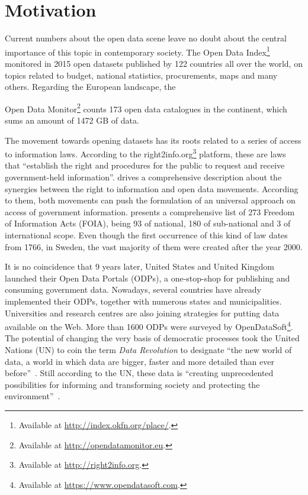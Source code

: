 \section{Motivation}
Current numbers about the open data scene leave no doubt about the central importance of this topic in contemporary society.
The Open Data Index\footnote{Available at \url{http://index.okfn.org/place/}.} monitored in 2015 open datasets published by 122 countries all over the world, on topics related to budget, national statistics, procurements, maps and many others.
Regarding the European landscape, the {Open Data Monitor\footnote{Available at \url{http://opendatamonitor.eu}.} counts 173 open data catalogues in the continent, which sums an amount of 1472 GB of data.

The movement towards opening datasets has its roots related to a series of access to information laws. 
According to the right2info.org\footnote{Available at \url{http://right2info.org}.} platform, these are laws that ``establish the right and procedures for the public to request and receive government-held information''.
 drives a comprehensive description about the synergies between the right to information and open data movements.
According to them, both movements can push the formulation of an universal approach on access of government information.
 presents a comprehensive list of 273 Freedom of Information Acts (FOIA), being 93 of national, 180 of sub-national and 3 of international scope.
Even though the first occurrence of this kind of law dates from 1766, in Sweden, the vast majority of them were created after the year 2000.

It is no coincidence that 9 years later, United States and United Kingdom launched their Open Data Portals (ODPs), a one-stop-shop for publishing and consuming government data.
Nowadays, several countries have already implemented their ODPs, together with numerous states and municipalities.
Universities and research centres are also joining strategies for putting data available on the Web.
More than 1600 ODPs were surveyed by OpenDataSoft\footnote{Available at \url{https://www.opendatasoft.com}.}.
The potential of changing the very basis of democratic processes took the United Nations (UN) to coin the term \emph{Data Revolution} to designate ``the new world of data, a world in which data are bigger, faster and more detailed than ever before''~\cite[p.4]{DataRevolutionGroup2014}.
Still according to the UN, these data is ``creating unprecedented possibilities for informing and transforming society and protecting the environment''~\cite[p.4]{DataRevolutionGroup2014}.

}
